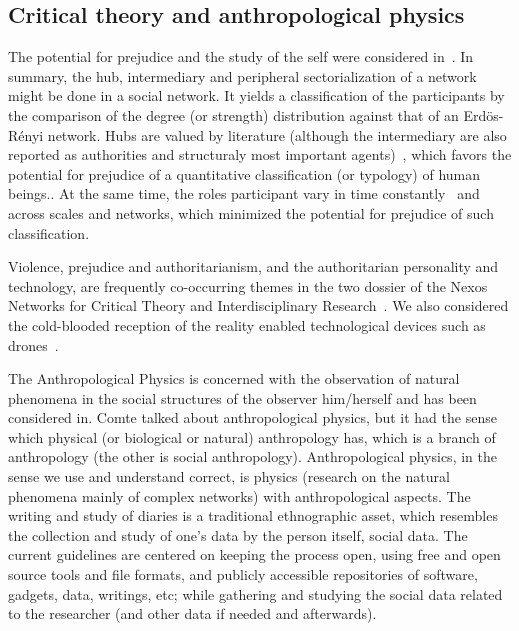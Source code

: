 \documentclass[letterpaper,10pt]{article}
\begin{document}
\subsection{Critical theory and anthropological physics}\label{exp}
The potential for prejudice and the study of the self
were considered in~\cite{imp,stab,tese}.
In summary, the hub, intermediary and peripheral sectorialization
of a network might be done in a social network.
It yields a classification of the participants
by the comparison of the degree (or strength) distribution
against that of an Erdös-Rényi network.
Hubs are valued by literature
(although the intermediary are also reported as authorities
and structuraly most important agents)~\cite{ega},
which favors the potential for prejudice
of a quantitative classification (or typology)
of human beings..
At the same time, the roles participant
vary in time constantly~\cite{stab,tese}
and across scales and networks,
which minimized the potential
for prejudice of such classification.

Violence, prejudice and authoritarianism,
and the authoritarian personality and technology,
are frequently co-occurring themes in the two dossier of the
Nexos Networks for Critical Theory and Interdisciplinary Research~\cite{nexos1}.
We also considered the cold-blooded reception of the reality
enabled technological devices such as drones~\cite{drones}.


The Anthropological Physics is concerned
with the observation of natural
phenomena in the social structures
of the observer him/herself and has been
considered in.
Comte talked about anthropological physics,
but it had the sense which physical (or biological or natural)
anthropology has, which is a branch of anthropology
(the other is social anthropology).
Anthropological physics, in the sense we use and understand correct,
is physics (research on the natural phenomena mainly of complex networks)
with anthropological aspects.
The writing and study of diaries is a traditional ethnographic asset,
which resembles the collection and study of one's data by the person itself,
social data.
The current guidelines are centered on keeping the process open,
using free and open source tools and file formats,
and publicly accessible repositories of software, gadgets, data, writings, etc;
while gathering and studying the social data related to the researcher
(and other data if needed and afterwards).~\cite{an,an2,imp,tese}
\end{document}
